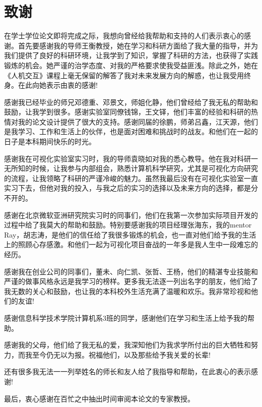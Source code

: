 \chapter{致谢}

在学士学位论文即将完成之际，我想向曾经给我帮助和支持的人们表示衷心的感谢。首先要感谢我的导师王衡教授，她在学习和科研方面给了我大量的指导，并为我们提供了良好的科研环境，让我学到了知识，掌握了科研的方法，也获得了实践锻炼的机会。她严谨的治学态度、对我的严格要求使我受益匪浅。除此之外，她在《人机交互》课程上毫无保留的解答了我对未来发展方向的解惑，也让我受用终身。在此向她表示由衷的感谢!

感谢我已经毕业的师兄邓德重、邓景文，师姐化静，他们曾经给了我无私的帮助和鼓励，让我学到很多。感谢实验室同僚钱锦，王文铎，他们丰富的经验和科研的热情对我的论文设计提供了很大的支持。感谢同届的徐鹏，师弟吕鑫，江天源，他们是我学习、工作和生活上的伙伴，也是面对困难和挑战时的战友。和他们在一起的日子是本科期间快乐的时光。

感谢我在可视化实验室实习时，我的导师袁晓如对我的悉心教导。他在我对科研一无所知的时候，让我参与内部组会，熟悉计算机科学研究，尤其是可视化方向研究的流程，让我领略了科研的严谨冷峻的魅力。虽然我最后没有在可视化实验室一直实习下去，但他对我的投入，与我之后的实习的选择以及未来方向的选择，都是分不开的。

感谢在北京微软亚洲研究院实习时的同事们，他们在我第一次参加实际项目开发的过程中给了我莫大的帮助和鼓励。特别要感谢我的项目经理张海东，我的mentor Ray，胡志涛，是他们的信任给了我很多锻炼的机会，也一直对他们给予我的生活上的照顾心存感激。和他们一起为可视化项目奋战的一年多是我人生中一段难忘的经历。

感谢我在创业公司的同事们，董未、向仁凯、张哲、王杨，他们的精湛专业技能和严谨的做事风格永远是我学习的榜样。更多我无法逐一列出名字的朋友，他们给了我无数的关心和鼓励，也让我的本科校外生活充满了温暖和欢乐。我非常珍视和他们的友谊!

感谢信息科学技术学院计算机系3班的同学，感谢他们在学习和生活上给予我的帮助。

感谢我的父母，他们给了我无私的爱，我深知他们为我求学所付出的巨大牺牲和努力，而我至今仍无以为报。祝福他们，以及那些给予我关爱的长辈!

还有很多我无法一一列举姓名的师长和友人给了我指导和帮助，在此衷心的表示感谢!

最后，衷心感谢在百忙之中抽出时间审阅本论文的专家教授。
